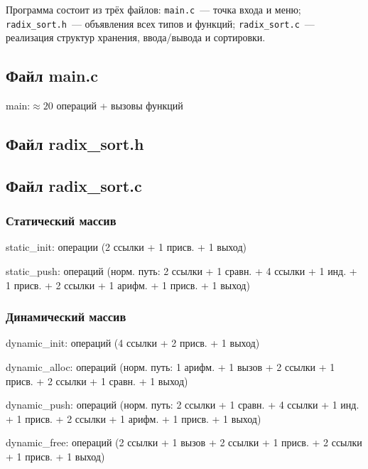 \documentclass[a4paper,14pt]{extarticle}
\newcommand{\opcount}[2]{%
  \par\vspace{2pt}%
  \noindent
  \colorbox{gray!15}{%
    \parbox{\dimexpr\linewidth-2\fboxsep\relax}{%
      \small\bfseries\ttfamily\raggedright #1:\enskip #2%
    }%
  }%
  \par\vspace{6pt}%
}
\begin{document}
Программа состоит из трёх файлов: \texttt{main.c}~--- точка входа и меню; \texttt{radix\_sort.h}~--- объявления всех типов и функций; \texttt{radix\_sort.c}~--- реализация структур хранения, ввода/вывода и сортировки.

\subsection{Файл main.c}


\opcount{main}{$\approx 20$ операций + вызовы функций}

\subsection{Файл radix\_sort.h}



\subsection{Файл radix\_sort.c}

\subsubsection*{Статический массив}


\opcount{static\_init}{4 операции (2 ссылки + 1 присв. + 1 выход)}
\opcount{static\_push}{14 операций (норм. путь: 2 ссылки + 1 сравн. + 4 ссылки + 1 инд. + 1 присв. + 2 ссылки + 1 арифм. + 1 присв. + 1 выход)}

\subsubsection*{Динамический массив}


\opcount{dynamic\_init}{7 операций (4 ссылки + 2 присв. + 1 выход)}
\opcount{dynamic\_alloc}{9 операций (норм. путь: 1 арифм. + 1 вызов + 2 ссылки + 1 присв. + 2 ссылки + 1 сравн. + 1 выход)}
\opcount{dynamic\_push}{14 операций (норм. путь: 2 ссылки + 1 сравн. + 4 ссылки + 1 инд. + 1 присв. + 2 ссылки + 1 арифм. + 1 присв. + 1 выход)}
\opcount{dynamic\_free}{10 операций (2 ссылки + 1 вызов + 2 ссылки + 1 присв. + 2 ссылки + 1 присв. + 1 выход)}
\end{document}
